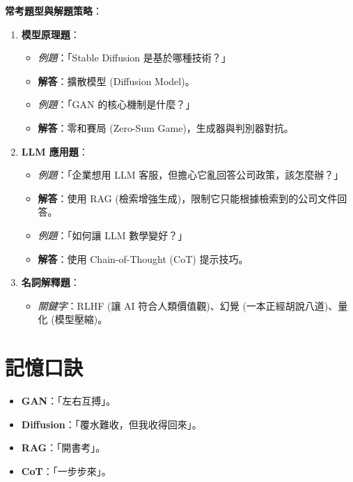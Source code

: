 \documentclass[
  letterpaper,
  DIV=11,
  numbers=noendperiod]{scrreprt}
\providecommand{\tightlist}{%
  \setlength{\itemsep}{0pt}\setlength{\parskip}{0pt}}
\begin{document}
\textbf{常考題型與解題策略}：

\begin{enumerate}
\def\labelenumi{\arabic{enumi}.}
\tightlist
\item
  \textbf{模型原理題}：

  \begin{itemize}
  \tightlist
  \item
    \emph{例題}：「Stable Diffusion 是基於哪種技術？」
  \item
    \textbf{解答}：擴散模型 (Diffusion Model)。
  \item
    \emph{例題}：「GAN 的核心機制是什麼？」
  \item
    \textbf{解答}：零和賽局 (Zero-Sum Game)，生成器與判別器對抗。
  \end{itemize}
\item
  \textbf{LLM 應用題}：

  \begin{itemize}
  \tightlist
  \item
    \emph{例題}：「企業想用 LLM
    客服，但擔心它亂回答公司政策，該怎麼辦？」
  \item
    \textbf{解答}：使用 RAG
    (檢索增強生成)，限制它只能根據檢索到的公司文件回答。
  \item
    \emph{例題}：「如何讓 LLM 數學變好？」
  \item
    \textbf{解答}：使用 Chain-of-Thought (CoT) 提示技巧。
  \end{itemize}
\item
  \textbf{名詞解釋題}：

  \begin{itemize}
  \tightlist
  \item
    \emph{關鍵字}：RLHF (讓 AI 符合人類價值觀)、幻覺
    (一本正經胡說八道)、量化 (模型壓縮)。
  \end{itemize}
\end{enumerate}

\section{記憶口訣}\label{ux8a18ux61b6ux53e3ux8a23-7}

\begin{itemize}
\tightlist
\item
  \textbf{GAN}：「左右互搏」。
\item
  \textbf{Diffusion}：「覆水難收，但我收得回來」。
\item
  \textbf{RAG}：「開書考」。
\item
  \textbf{CoT}：「一步步來」。
\end{itemize}
\end{document}
